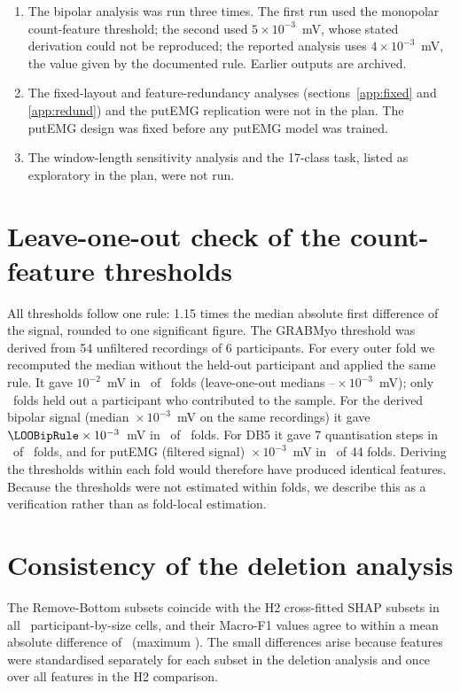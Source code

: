 \documentclass{iopjournal}
\begin{document}
\begin{enumerate}
\item The bipolar analysis was run three times. The first run used the monopolar count-feature threshold; the second used $5 \times 10^{-3}$~mV, whose stated derivation could not be reproduced; the reported analysis uses $4 \times 10^{-3}$~mV, the value given by the documented rule. Earlier outputs are archived.
\item The fixed-layout and feature-redundancy analyses (sections~\ref{app:fixed} and \ref{app:redund}) and the putEMG replication were not in the plan. The putEMG design was fixed before any putEMG model was trained.
\item The window-length sensitivity analysis and the 17-class task, listed as exploratory in the plan, were not run.
\end{enumerate}

\section{Leave-one-out check of the count-feature thresholds}
\label{app:threshold}
All thresholds follow one rule: 1.15 times the median absolute first difference of the signal, rounded to one significant figure. The GRABMyo threshold was derived from 54 unfiltered recordings of 6 participants. For every outer fold we recomputed the median without the held-out participant and applied the same rule. It gave $10^{-2}$~mV in \LOOMonoIdentical\ of \LOOMonoFolds\ folds (leave-one-out medians \LOOMonoMin--\LOOMonoMax${}\times 10^{-3}$~mV); only \LOOMonoInProbe\ folds held out a participant who contributed to the sample. For the derived bipolar signal (median \LOOBipPooled${}\times 10^{-3}$~mV on the same recordings) it gave $\LOOBipRule \times 10^{-3}$~mV in \LOOBipIdentical\ of \LOOBipFolds\ folds. For DB5 it gave 7 quantisation steps in \LOODBFiveIdentical\ of \LOODBFiveFolds\ folds, and for putEMG (filtered signal) \PutThresh${}\times 10^{-3}$~mV in \PutThreshIdentical\ of 44 folds. Deriving the thresholds within each fold would therefore have produced identical features. Because the thresholds were not estimated within folds, we describe this as a verification rather than as fold-local estimation.

\section{Consistency of the deletion analysis}
\label{app:faith}
The Remove-Bottom subsets coincide with the H2 cross-fitted SHAP subsets in all \FaithProtocolCells\ participant-by-size cells, and their Macro-F1 values agree to within a mean absolute difference of \FaithProtocolMeanDiff\ (maximum \FaithProtocolMaxDiff). The small differences arise because features were standardised separately for each subset in the deletion analysis and once over all features in the H2 comparison.
\end{document}
